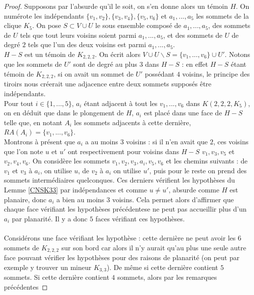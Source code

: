 \documentclass{scrartcl}
\begin{document}
\begin{flushleft}
\begin{proof}
    Supposons par l'absurde qu'il le soit, on s'en donne alors un témoin $H$. On numérote les indépendants $\{v_1, v_2\}, \{v_3, v_4\}, \{v_5, v_6\}$
    et $a_1, ..., a_5$ les sommets de la clique $K_5$. On pose $S \subset V \cup U$ le sous ensemble composé de $a_1, ..., a_5$, des sommets
    de $U$ tels que tout leurs voisins soient parmi $a_1, ..., a_5$, et des sommets de $U$ de degré $2$ tels que l'un des deux voisins
    est parmi $a_1, ..., a_5$.\\
    $H - S$ est un témoin de $K_{2,2,2}$. On écrit alors $V \cup U \backslash S = \{v_1, ..., v_6\} \cup U'$.
    Notons que les sommets de $U'$ sont de degré au plus $3$ dans $H - S$ : en effet $H-S$ étant témoin de $K_{2,2,2}$, si on avait
    un sommet de $U'$ possédant $4$ voisins, le principe des tiroirs nous créerait une adjacence entre deux sommets supposés être
    indépendants.\\
    Pour tout $i \in \{1, ..., 5\}$, $a_i$ étant adjacent à tout les $v_1, ..., v_6$ dans $K(2,2,2,K_5)$, on en déduit que dans le plongement
    de $H$, $a_i$ est placé dans une face de $H-S$ telle que, en notant $A_i$ les sommets adjacents à cette dernière, $RA(A_i) = \{v_1, ..., v_6\}$.\\
    Montrons à présent que $a_i$ a au moins $3$ voisins : si il n'en avait que $2$, ces voisins que l'on note
    $u$ et $u'$ ont respectivement pour voisins dans $H - S$ $v_1, v_3, v_5$ et $v_2, v_4, v_6$. On considère les sommets $v_1, v_2, v_3, a_i, v_5, v_6$
    et les chemins suivants : de $v_1$ et $v_3$ à $a_i$, on utilise $u$, de $v_2$ à $a_i$ on utilise $u'$, puis pour le reste on prend des sommets
    intermédiaires quelconques. Ces derniers vérifient les hypothèses du Lemme \ref{CNSK33} par indépendances et comme $u \neq u'$, absurde comme $H$
    est planaire, donc $a_i$ a bien au moins $3$ voisins. Cela permet alors d'affirmer que chaque face vérifiant les hypothèses précédentese
    ne peut pas accueillir plus d'un $a_i$ par planarité. Il y a donc $5$ faces vérifiant ces hypothèses.
    \\~\\
    Considérons une face vérifiant les hypothèse : cette dernière ne peut avoir les $6$ sommets de $K_{2,2,2}$ sur son bord car alors il n'y aurait
    qu'au plus une seule autre face pouvant vérifier les hypothèses pour des raisons de planarité (on peut par exemple y trouver un mineur
    $K_{3,3}$). De même si cette dernière contient $5$ sommets. Si cette dernière contient $4$ sommets, alors par les remarques précédentes

\end{proof}
\end{flushleft}
\end{document}

